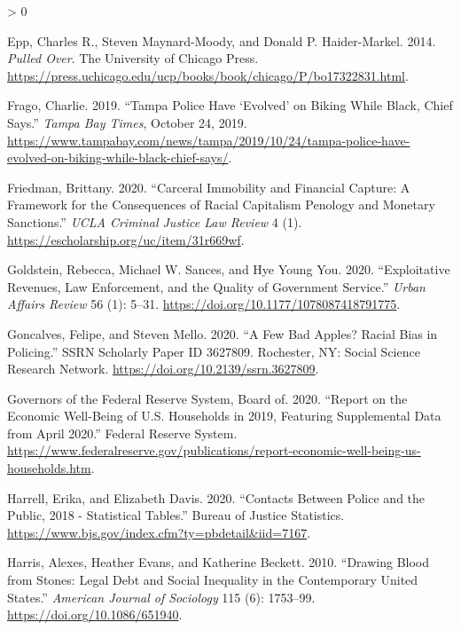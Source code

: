 \documentclass[
  12pt,
]{article}
\newlength{\cslhangindent}
\newenvironment{CSLReferences}[2] %
 {%
  \setlength{\parindent}{0pt}
  \ifodd #1 \everypar{\setlength{\hangindent}{\cslhangindent}}\ignorespaces\fi
  \ifnum #2 > 0
  \setlength{\parskip}{#2\baselineskip}
  \fi
 }%
 {}
\begin{document}
\begin{CSLReferences}{1}{0}
\leavevmode\hypertarget{ref-Epp2014}{}%
Epp, Charles R., Steven Maynard-Moody, and Donald P. Haider-Markel. 2014. \emph{Pulled {Over}}. {The University of Chicago Press}. \url{https://press.uchicago.edu/ucp/books/book/chicago/P/bo17322831.html}.

\leavevmode\hypertarget{ref-Frago2019}{}%
Frago, Charlie. 2019. {``Tampa Police Have {`Evolved'} on Biking While Black, Chief Says.''} \emph{Tampa Bay Times}, October 24, 2019. \url{https://www.tampabay.com/news/tampa/2019/10/24/tampa-police-have-evolved-on-biking-while-black-chief-says/}.

\leavevmode\hypertarget{ref-Friedman2020}{}%
Friedman, Brittany. 2020. {``Carceral {Immobility} and {Financial Capture}: {A Framework} for the {Consequences} of {Racial Capitalism Penology} and {Monetary Sanctions}.''} \emph{UCLA Criminal Justice Law Review} 4 (1). \url{https://escholarship.org/uc/item/31r669wf}.

\leavevmode\hypertarget{ref-Goldstein2020}{}%
Goldstein, Rebecca, Michael W. Sances, and Hye Young You. 2020. {``Exploitative {Revenues}, {Law Enforcement}, and the {Quality} of {Government Service}.''} \emph{Urban Affairs Review} 56 (1): 5--31. \url{https://doi.org/10.1177/1078087418791775}.

\leavevmode\hypertarget{ref-Goncalves2020}{}%
Goncalves, Felipe, and Steven Mello. 2020. {``A {Few Bad Apples}? {Racial Bias} in {Policing}.''} SSRN Scholarly Paper ID 3627809. {Rochester, NY}: {Social Science Research Network}. \url{https://doi.org/10.2139/ssrn.3627809}.

\leavevmode\hypertarget{ref-BoardofGovernorsoftheFederalReserveSystem2020}{}%
Governors of the Federal Reserve System, Board of. 2020. {``Report on the {Economic Well}-{Being} of {U}.{S}. {Households} in 2019, {Featuring Supplemental Data} from {April} 2020.''} {Federal Reserve System}. \url{https://www.federalreserve.gov/publications/report-economic-well-being-us-households.htm}.

\leavevmode\hypertarget{ref-Harrell2020}{}%
Harrell, Erika, and Elizabeth Davis. 2020. {``Contacts {Between Police} and the {Public}, 2018 - {Statistical Tables}.''} {Bureau of Justice Statistics}. \url{https://www.bjs.gov/index.cfm?ty=pbdetail\&iid=7167}.

\leavevmode\hypertarget{ref-Harris2010}{}%
Harris, Alexes, Heather Evans, and Katherine Beckett. 2010. {``Drawing {Blood} from {Stones}: {Legal Debt} and {Social Inequality} in the {Contemporary United States}.''} \emph{American Journal of Sociology} 115 (6): 1753--99. \url{https://doi.org/10.1086/651940}.


\end{CSLReferences}
\end{document}
